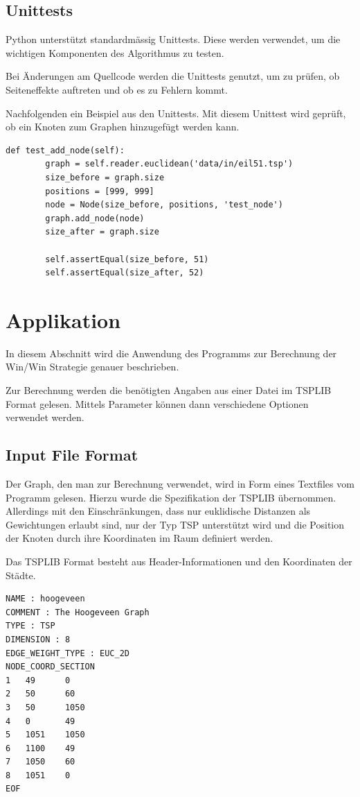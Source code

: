 \documentclass[11pt,a4paper]{article}
\begin{document}
\subsection{Unittests}
Python unterstützt standardmässig Unittests. Diese werden verwendet, um die wichtigen Komponenten des Algorithmus zu testen.

Bei Änderungen am Quellcode werden die Unittests genutzt, um zu prüfen, ob Seiteneffekte auftreten und ob es zu Fehlern kommt.

Nachfolgenden ein Beispiel aus den Unittests. Mit diesem Unittest wird geprüft, ob ein Knoten zum Graphen hinzugefügt werden kann.

\begin{verbatim}
def test_add_node(self):
        graph = self.reader.euclidean('data/in/eil51.tsp')
        size_before = graph.size
        positions = [999, 999]
        node = Node(size_before, positions, 'test_node')
        graph.add_node(node)
        size_after = graph.size
    
        self.assertEqual(size_before, 51) 
        self.assertEqual(size_after, 52)
\end{verbatim}
\newpage

\section{Applikation}
In diesem Abschnitt wird die Anwendung des Programms zur Berechnung der Win/Win Strategie genauer beschrieben.

Zur Berechnung werden die benötigten Angaben aus einer Datei im TSPLIB Format gelesen. Mittels Parameter können dann verschiedene Optionen verwendet werden.

\subsection{Input File Format}
Der Graph, den man zur Berechnung verwendet, wird in Form eines Textfiles vom Programm gelesen. Hierzu wurde die Spezifikation der TSPLIB übernommen. Allerdings mit den Einschränkungen, dass nur euklidische Distanzen als Gewichtungen erlaubt sind, nur der Typ TSP unterstützt wird und die Position der Knoten durch ihre Koordinaten im Raum definiert werden.

Das TSPLIB Format besteht aus Header-Informationen und den Koordinaten der Städte.

\begin{verbatim}
NAME : hoogeveen 
COMMENT : The Hoogeveen Graph 
TYPE : TSP 
DIMENSION : 8 
EDGE_WEIGHT_TYPE : EUC_2D
NODE_COORD_SECTION
1   49      0   
2   50      60  
3   50      1050
4   0       49  
5   1051    1050
6   1100    49  
7   1050    60  
8   1051    0   
EOF
\end{verbatim}
\end{document}
